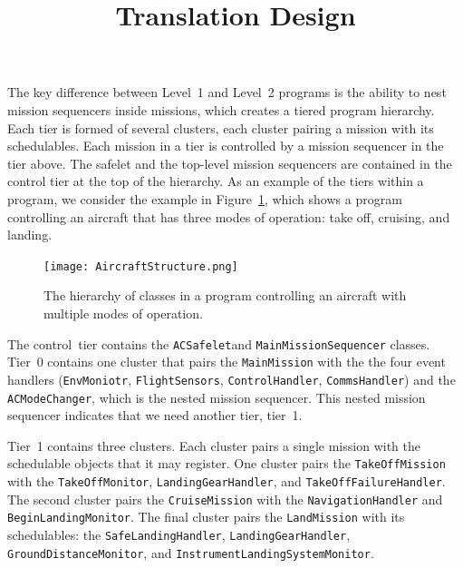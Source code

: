 \documentclass[10pt,a4paper]{article}
\begin{document}
\title{Translation Design}
\date{}
\maketitle


The key difference between Level~1 and Level~2 programs is the ability to nest mission sequencers inside missions, which creates a tiered program hierarchy. Each tier is formed of several clusters, each cluster pairing a mission with its schedulables. Each mission in a tier is controlled by a mission sequencer in the tier above. The safelet and the top-level mission sequencers are contained in the control tier at the top of the hierarchy. As an example of the tiers within a program, we consider the example in Figure~\ref{fig:AircraftDiagram}, which shows a program controlling an aircraft that has three modes of operation: take off, cruising, and landing.

\begin{figure}[!h]
\begin{center}
\texttt{[image: AircraftStructure.png]}
\caption{The hierarchy of classes in a program controlling an aircraft with multiple modes of operation. \label{fig:AircraftDiagram}}
\end{center}
\end{figure}

The control~tier contains the \texttt{ACSafelet}and \texttt{MainMissionSequencer} classes. Tier~0 contains one cluster that pairs the \texttt{MainMission} with the the four event handlers (\texttt{EnvMoniotr}, \texttt{FlightSensors}, \texttt{ControlHandler}, \texttt{CommsHandler}) and the \texttt{ACModeChanger}, which is the nested mission sequencer. This nested mission sequencer indicates that we need another tier, tier~1.

Tier~1 contains three clusters. Each cluster pairs a single mission with the schedulable objects that it may register. One cluster pairs the \texttt{TakeOffMission} with the \texttt{TakeOffMonitor}, \texttt{LandingGearHandler}, and \texttt{TakeOffFailureHandler}. The second cluster pairs the \texttt{CruiseMission} with the \texttt{NavigationHandler} and \texttt{BeginLandingMonitor}. The final cluster pairs the \texttt{LandMission} with its schedulables: the \texttt{SafeLandingHandler}, \texttt{LandingGearHandler}, \texttt{GroundDistanceMonitor}, and \texttt{InstrumentLandingSystemMonitor}. 
\end{document}
